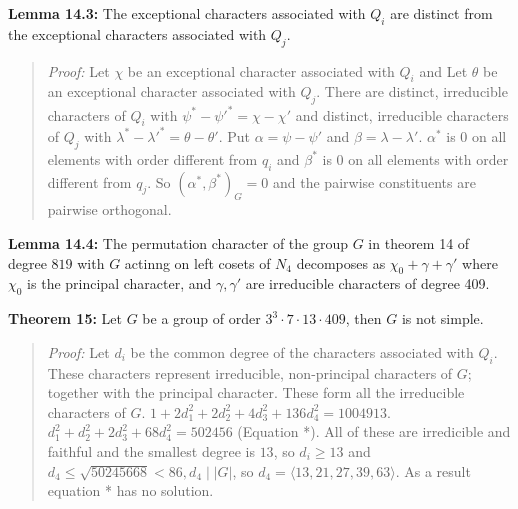 {\bf Lemma 14.3:} The exceptional characters associated with $Q_i$ are distinct from the exceptional characters
associated with $Q_j$.
\begin{quote}
\emph{Proof:}
Let $\chi$ be an exceptional character associated with $Q_i$ and
Let $\theta$ be an exceptional character associated with $Q_j$.
There are distinct, irreducible characters of $Q_i$ with $\psi^* - \psi'^* = \chi - \chi'$
and distinct, irreducible characters of $Q_j$ with $\lambda^* - \lambda'^* = \theta - \theta'$.
Put $\alpha = \psi - \psi'$ and $\beta = \lambda - \lambda'$.
$\alpha^*$ is $0$ on all elements with order different from $q_i$ and
$\beta^*$ is $0$ on all elements with order different from $q_j$.  So $(\alpha^*, \beta^*)_G = 0$ and the pairwise
constituents are pairwise orthogonal.
\end{quote}
{\bf Lemma 14.4:} The permutation character of the group $G$ in theorem 14 of degree $819$ with $G$ actinng on left cosets of
$N_4$ decomposes as $\chi_0 + \gamma + \gamma'$ where $\chi_0$ is the principal character, and $\gamma, \gamma'$ are irreducible characters
of degree 409.
\begin{quote}
\end{quote}
{\bf Theorem 15:}
Let $G$ be a group of order $3^3 \cdot 7 \cdot 13 \cdot 409$, then $G$ is not simple.
\begin{quote}
\emph{Proof:}
Let $d_i$ be the common degree of the characters associated with $Q_i$.  These characters represent
irreducible, non-principal characters of $G$; together with the principal character.  These form all
the irreducible characters of $G$.  $1 + 2d_1^2 + 2d_2^2 + 4 d_3^2 + 136 d_4^2 = 1004913$.
$d_1^2 + d_2^2 + 2 d_3^2 + 68 d_4^2 = 502456$ (Equation *). All of these are irredicible and faithful and the smallest
degree is $13$, so $d_i \geq 13$ and $d_4 \leq {\sqrt {50245668}} < 86, d_4 \mid |G|$, so
$d_4 = \langle 13, 21, 27, 39, 63 \rangle$. As a result equation * has no solution.
\end{quote}

